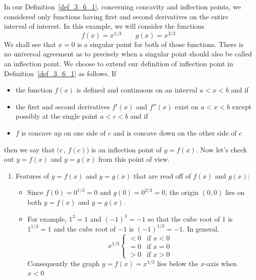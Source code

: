 \begin{eg}[Optional ---  $y=x^{1/3}$ and $y = x^{2/3}$]\label{eg_InflectSing}

In our Definition~\ref{def_3_6_1}, concerning concavity and inflection points,
we considered only functions having first and second derivatives on the entire
interval of interest. In this example, we will consider the functions
\begin{equation*}
f(x)=x^{1/3}\qquad g(x)=x^{2/3}
\end{equation*}
We shall see that $x=0$ is a singular point for both of those functions.
There is no universal agreement as to precisely when a singular point should 
also be called an inflection point. We choose to extend our definition of
inflection point in Definition~\ref{def_3_6_1} as follows. If 
\begin{itemize}
\item 
the function $f(x)$ is defined and continuous on an interval $a<x<b$ and
if
\item 
the first and second derivatives $f'(x)$ and $f''(x)$ exist on $a<x<b$
except possibly at the single point $a<c<b$ and if
\item 
$f$ is concave up on one side of $c$ and is concave down on the other 
side of $c$
\end{itemize}
then we say that $\big(c\,,\,f(c)\big)$ is an inflection point of $y=f(x)$. 
Now let's check out $y=f(x)$ and $y=g(x)$ from this point of view.
\begin{enumerate}[(1)]
\item Features of $y=f(x)$ and $y=g(x)$ that are read off of $f(x)$ and $g(x)$: 
\begin{itemize}
 \item 
    Since $f(0)=0^{1/3}=0$ and $g(0)=0^{2/3}=0$, the origin $(0,0)$ lies on 
    both $y=f(x)$ and $y=g(x)$.
 \item
    For example, $1^3=1$ and $(-1)^3=-1$ so that the cube root of $1$ is 
    $1^{1/3}=1$ and the cube root of $-1$ is $(-1)^{1/3}=-1$. In general,
    \begin{equation*}
       x^{1/3}\begin{cases}
               <0 & \text{if }x< 0 \\
               =0 & \text{if }x=0 \\
               >0 & \text{if }x> 0 
              \end{cases}
    \end{equation*}
   Consequently the graph $y=f(x)=x^{1/3}$ lies below the $x$-axis when $x<0$

\end{itemize}
\end{enumerate}
\end{eg}
